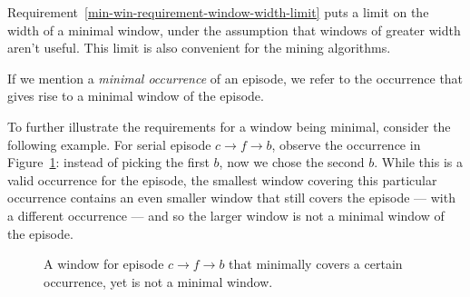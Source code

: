 Requirement~\ref{min-win-requirement-window-width-limit} puts a limit on the width of a minimal window, under the assumption that windows of greater width aren't useful. This limit is also convenient for the mining algorithms.

If we mention a \emph{minimal occurrence} of an episode, we refer to the occurrence that gives rise to a minimal window of the episode.

To further illustrate the requirements for a window being minimal, consider the following example. For serial episode $ c \to f \to b $, observe the occurrence in Figure~\ref{fig:mwi-non-minimal-window}: instead of picking the first $ b $, now we chose the second $ b $. While this is a valid occurrence for the episode, the smallest window covering this particular occurrence contains an even smaller window that still covers the episode --- with a different occurrence --- and so the larger window is not a minimal window of the episode.

\begin{figure}
\centering


\caption{A window for episode $ c \to f \to b $ that minimally covers a certain occurrence, yet is not a minimal window.}
\label{fig:mwi-non-minimal-window}
\end{figure}


